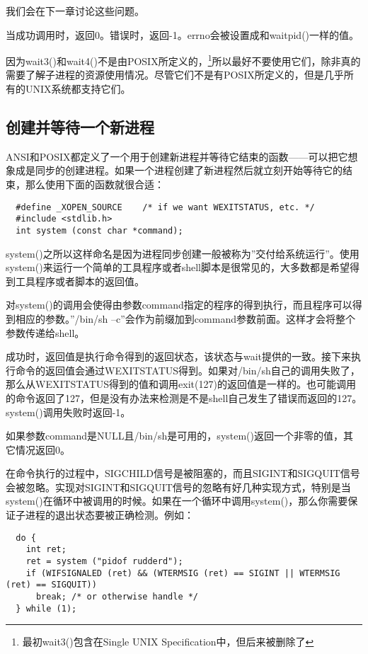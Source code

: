 我们会在下一章讨论这些问题。

当成功调用时，返回0。错误时，返回-1。errno会被设置成和waitpid()一样的值。

因为wait3()和wait4()不是由POSIX所定义的，\footnote[1]{最初wait3()包含在Single UNIX Specification中，但后来被删除了}所以最好不要使用它们，除非真的需要了解子进程的资源使用情况。尽管它们不是有POSIX所定义的，但是几乎所有的UNIX系统都支持它们。

\subsection{创建并等待一个新进程}

ANSI和POSIX都定义了一个用于创建新进程并等待它结束的函数——可以把它想象成是同步的创建进程。如果一个进程创建了新进程然后就立刻开始等待它的结束，那么使用下面的函数就很合适：

\begin{lstlisting}
  #define _XOPEN_SOURCE    /* if we want WEXITSTATUS, etc. */
  #include <stdlib.h>
  int system (const char *command);
\end{lstlisting}

system()之所以这样命名是因为进程同步创建一般被称为''交付给系统运行''。使用system()来运行一个简单的工具程序或者shell脚本是很常见的，大多数都是希望得到工具程序或者脚本的返回值。

对system()的调用会使得由参数command指定的程序的得到执行，而且程序可以得到相应的参数。''/bin/sh –c''会作为前缀加到command参数前面。这样才会将整个参数传递给shell。

成功时，返回值是执行命令得到的返回状态，该状态与wait提供的一致。接下来执行命令的返回值会通过WEXITSTATUS得到。如果对/bin/sh自己的调用失败了，那么从WEXITSTATUS得到的值和调用exit(127)的返回值是一样的。也可能调用的命令返回了127，但是没有办法来检测是不是shell自己发生了错误而返回的127。system()调用失败时返回-1。

如果参数command是NULL且/bin/sh是可用的，system()返回一个非零的值，其它情况返回0。

在命令执行的过程中，SIGCHILD信号是被阻塞的，而且SIGINT和SIGQUIT信号会被忽略。实现对SIGINT和SIGQUIT信号的忽略有好几种实现方式，特别是当system()在循环中被调用的时候。如果在一个循环中调用system()，那么你需要保证子进程的退出状态要被正确检测。例如：

\begin{lstlisting}
  do {
    int ret;
    ret = system ("pidof rudderd");
    if (WIFSIGNALED (ret) && (WTERMSIG (ret) == SIGINT || WTERMSIG (ret) == SIGQUIT))
      break; /* or otherwise handle */
  } while (1);
\end{lstlisting}

